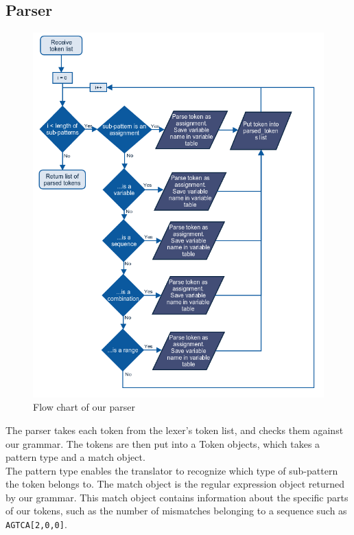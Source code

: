 \documentclass[12pt]{article}
\begin{document}
\subsection{Parser}
\begin{figure}[H]
	\begin{center}
		\includegraphics[scale=0.65]{parser.png}
	\end{center}	
	\caption{Flow chart of our parser}
\end{figure}

The parser takes each token from the lexer's token list, and checks them against our grammar. The tokens are then put into a Token objects, which takes a pattern type and a match object. \\
The pattern type enables the translator to recognize which type of sub-pattern the token belongs to. The match object is the regular expression object returned by our grammar. This match object contains information about the specific parts of our tokens, such as the number of mismatches belonging to a sequence such as \texttt{AGTCA[2,0,0]}.
\end{document}
